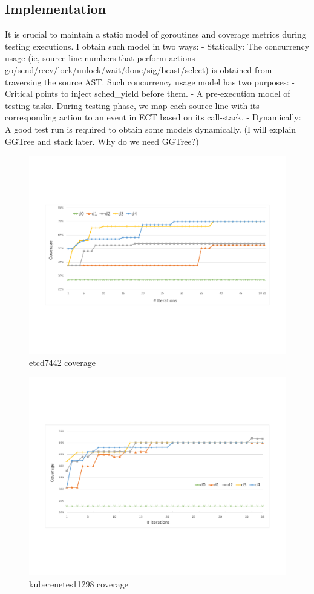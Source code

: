 \subsection{Implementation}
It is crucial to maintain a static model of goroutines and coverage metrics during testing executions. I obtain such model in two ways:
-	Statically: The concurrency usage (ie, source line numbers that perform actions go/send/recv/lock/unlock/wait/done/sig/bcast/select) is obtained from traversing the source AST. Such concurrency usage model has two purposes:
- Critical points to inject sched\_yield before them.
- A pre-execution model of testing tasks. During testing phase, we map each source line with its corresponding action to an event in ECT based on its call-stack.
-	Dynamically: A good test run is required to obtain some models dynamically. (I will explain GGTree and stack later. Why do we need GGTree?)




\begin{figure}
\centering
  \includegraphics[width=.95\linewidth]{figs/coverage_etcd7443.pdf}
  \caption{etcd7442 coverage}
  \label{fig:etcd_coverage}
\end{figure}


\begin{figure}
\centering
  \includegraphics[width=.95\linewidth]{figs/coverage_kubernetes11298.pdf}
  \caption{kuberenetes11298 coverage}
  \label{fig:kubernetes_coverage}
\end{figure}
